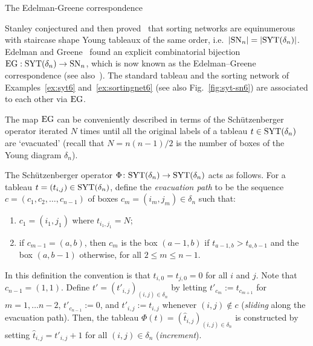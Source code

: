 \documentclass[a4paper,reqno,12pt]{amsart}
\makeatletter
\theoremstyle{plain}
\theoremstyle{definition}
\renewcommand\subsection{\@startsection{subsection}{2}%
  \z@{.5\linespacing\@plus.7\linespacing}{-.5em}%
  {\bfseries\scshape}}
\newcommand{\syt}{\textnormal{SYT}}
\newcommand{\staircase}{\delta}
\newcommand{\sort}{\textnormal{SN}}
\newcommand{\eg}{\textnormal{EG}}
\newcommand{\1}{\mathbbm{1}}
\renewcommand{\hat}{\widehat}
\makeatother
\begin{document}
\subsection{The Edelman-Greene correspondence}
\label{subsec:EG}

Stanley conjectured and then proved~\cite{stanley84} that sorting networks are equinumerous with staircase shape Young tableaux of the same order, i.e.\ $|\sort_n|=|\syt(\staircase_n)|$.
Edelman and Greene~\cite{edelmanGreene87} found an explicit combinatorial bijection $\eg:\syt(\staircase_n)\to\sort_n$, which is now known as the Edelman--Greene correspondence (see also~\cite{hamakerYoung14, lascouxSchutzenberger82, little03}).
The standard tableau and the sorting network of Examples~\ref{ex:syt6} and~\ref{ex:sortingnet6} (see also Fig.~\eqref{fig:syt-sn6}) are associated to each other via $\eg$.

The map $\eg$ can be conveniently described in terms of the Sch\"utzenberger operator iterated $N$ times until all the original labels of a tableau $t\in \syt(\staircase_n)$ are `evacuated' (recall that $N=n(n-1)/2$ is the number of boxes of the Young diagram $\delta_n$).

The Sch\"utzenberger operator $\Phi \colon \syt(\staircase_n)\to \syt(\staircase_n)$ acts as follows.
For a tableau $t = (t_{i,j})\in \syt(\staircase_n)$, define the \emph{evacuation path} to be the sequence $c=(c_1,c_2,\ldots, c_{n-1})$ of boxes $c_m=(i_m,j_m)\in\delta_n$ such that:
\begin{enumerate}[label=(\roman*)]
\item $c_1=(i_1,j_1)$ where  $t_{i_1,j_1}=N$;
\item if $c_{m-1}=(a,b)$, then $c_m$ is the box $(a-1,b)$ if $t_{a-1,b}>t_{a,b-1}$ and the box $(a,b-1)$ otherwise, for all $2\leq m \leq n-1$.
\end{enumerate}
In this definition the convention is that $t_{i,0}=t_{j,0}=0$ for all $i$ and $j$.
Note that $c_{n-1}=(1,1)$.
Define $t' = (t'_{i,j})_{(i,j)\in \delta_n}$ by letting $t'_{c_m}:=t_{c_{m+1}}$ for $m=1,\dots n-2$, $t'_{c_{n-1}}:=0$, and $t'_{i,j}:=t_{i,j}$ whenever $(i,j)\notin c$ (\emph{sliding} along the evacuation path).
Then, the tableau $\Phi(t)=(\hat{t}_{i,j})_{(i,j)\in\delta_n}$ is constructed by setting $\hat{t}_{i,j}=t'_{i,j}+1$ for all $(i,j)\in \delta_n$ (\emph{increment}).
\end{document}
